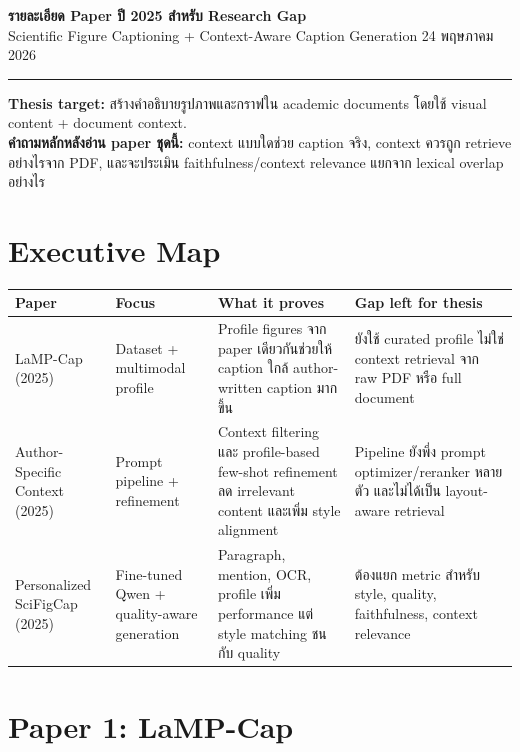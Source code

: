 \documentclass[10pt,a4paper]{article}
\begin{document}
\small

{\Large\bfseries รายละเอียด Paper ปี 2025 สำหรับ Research Gap}\\[-1pt]
{\color{muted}Scientific Figure Captioning + Context-Aware Caption Generation \hfill 24 พฤษภาคม 2026}

\vspace{4pt}
\hrule height 0.8pt
\vspace{6pt}

\begin{note}
\textbf{Thesis target:} สร้างคำอธิบายรูปภาพและกราฟใน academic documents โดยใช้ visual content + document context. \\
\textbf{คำถามหลักหลังอ่าน paper ชุดนี้:} context แบบใดช่วย caption จริง, context ควรถูก retrieve อย่างไรจาก PDF, และจะประเมิน faithfulness/context relevance แยกจาก lexical overlap อย่างไร
\end{note}

\section*{Executive Map}

\begin{longtable}{@{}L{3.15cm}L{2.1cm}L{4.15cm}L{5.15cm}@{}}
\toprule
\textbf{Paper} & \textbf{Focus} & \textbf{What it proves} & \textbf{Gap left for thesis} \\
\midrule
LaMP-Cap (2025) & Dataset + multimodal profile & Profile figures จาก paper เดียวกันช่วยให้ caption ใกล้ author-written caption มากขึ้น & ยังใช้ curated profile ไม่ใช่ context retrieval จาก raw PDF หรือ full document \\
Author-Specific Context (2025) & Prompt pipeline + refinement & Context filtering และ profile-based few-shot refinement ลด irrelevant content และเพิ่ม style alignment & Pipeline ยังพึ่ง prompt optimizer/reranker หลายตัว และไม่ได้เป็น layout-aware retrieval \\
Personalized SciFigCap (2025) & Fine-tuned Qwen + quality-aware generation & Paragraph, mention, OCR, profile เพิ่ม performance แต่ style matching ชนกับ quality & ต้องแยก metric สำหรับ style, quality, faithfulness, context relevance \\
\bottomrule
\end{longtable}

\section{Paper 1: LaMP-Cap}
\end{document}
